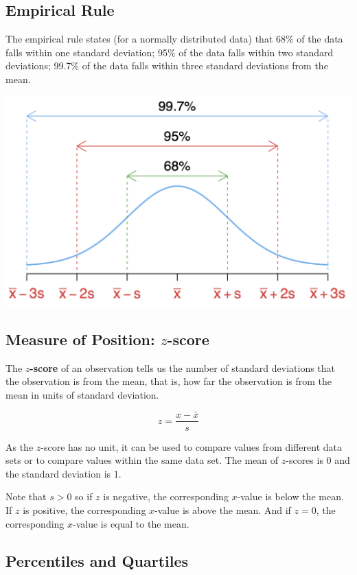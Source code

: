 \documentclass[
]{article}
\begin{document}
\hypertarget{empirical-rule}{%
\subsection{Empirical Rule}\label{empirical-rule}}

The empirical rule states (for a normally distributed data) that 68\% of
the data falls within one standard deviation; 95\% of the data falls
within two standard deviations; 99.7\% of the data falls within three
standard deviations from the mean.

\begin{center}\includegraphics[width=0.6\linewidth,height=0.6\textheight]{bell} \end{center}

\hypertarget{measure-of-position-z-score}{%
\subsection{\texorpdfstring{Measure of Position:
\(z\)-score}{Measure of Position: z-score}}\label{measure-of-position-z-score}}

The \textbf{\(z\)-score} of an observation tells us the number of
standard deviations that the observation is from the mean, that is, how
far the observation is from the mean in units of standard deviation.

\[z=\frac{x-\bar{x}}{s}\]

As the \(z\)-score has no unit, it can be used to compare values from
different data sets or to compare values within the same data set. The
mean of \(z\)-scores is 0 and the standard deviation is 1.

Note that \(s>0\) so if \(z\) is negative, the corresponding \(x\)-value
is below the mean. If \(z\) is positive, the corresponding \(x\)-value
is above the mean. And if \(z=0\), the corresponding \(x\)-value is
equal to the mean.

\hypertarget{percentiles-and-quartiles}{%
\subsection{Percentiles and Quartiles}\label{percentiles-and-quartiles}}
\end{document}
